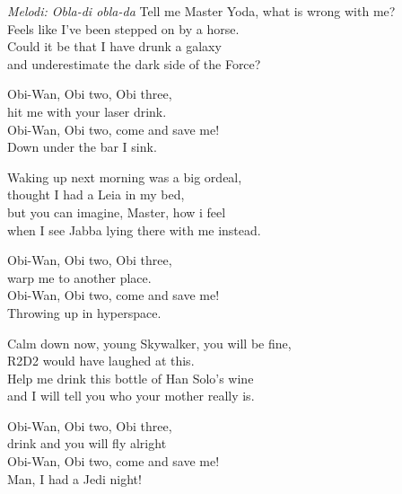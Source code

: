{\footnotesize\textit{Melodi: Obla-di obla-da}}
Tell me Master Yoda, what is wrong with me?\\
Feels like I've been stepped on by a horse.\\
Could it be that I have drunk a galaxy\\
and underestimate the dark side of the Force?\par
\vspace{10pt}
Obi-Wan, Obi two, Obi three,\\
hit me with your laser drink.\\
Obi-Wan, Obi two, come and save me! \\
Down under the bar I sink.\par
\vspace{10pt}
Waking up next morning was a big ordeal,\\
thought I had a Leia in my bed,\\
but you can imagine, Master, how i feel\\
when I see Jabba lying there with me instead.\par
\vspace{10pt}
Obi-Wan, Obi two, Obi three,\\
warp me to another place.\\
Obi-Wan, Obi two, come and save me!\\
Throwing up in hyperspace.\par
\vspace{10pt}
Calm down now, young Skywalker, you will be fine,\\
R2D2 would have laughed at this.\\
Help me drink this bottle of Han Solo’s wine\\
and I will tell you who your mother really is.\par
\vspace{10pt}
Obi-Wan, Obi two, Obi three,\\
drink and you will fly alright\\
Obi-Wan, Obi two, come and save me!\\
Man, I had a Jedi night!

